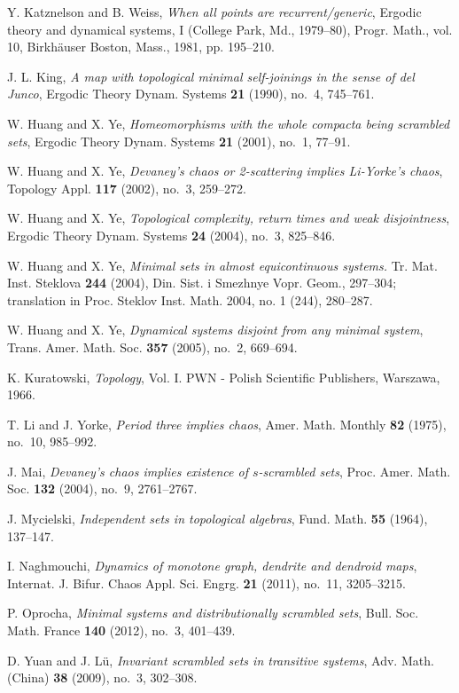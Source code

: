\documentclass[reqno,a4paper,12pt]{amsart}
\theoremstyle{definition}
\numberwithin{equation}{section}
\begin{document}
\begin{thebibliography}{99}
 Y. Katznelson and B. Weiss, \emph{When all points are recurrent/generic},
Ergodic theory and dynamical systems, I (College Park, Md., 1979--80), Progr. Math., vol. 10,
Birkh\"auser Boston, Mass., 1981, pp. 195--210.

 J. L. King, \emph{A map with topological minimal self-joinings in the sense of del Junco},
Ergodic Theory Dynam. Systems \textbf{21} (1990), no.~4, 745--761.

 W. Huang and X. Ye, \emph{Homeomorphisms with the whole compacta being scrambled sets},
Ergodic Theory Dynam. Systems \textbf{21} (2001), no.~1, 77--91.

 W. Huang and X. Ye, \emph{Devaney's chaos or 2-scattering implies {L}i-{Y}orke's chaos},
  Topology Appl. \textbf{117} (2002), no.~3, 259--272.

 W. Huang and X. Ye, \emph{Topological complexity, return times and weak disjointness},
Ergodic Theory Dynam. Systems \textbf{24} (2004), no.~3, 825--846.

 W. Huang and X. Ye,
\emph{Minimal sets in almost equicontinuous systems.} Tr. Mat. Inst. Steklova \textbf{244} (2004),
Din. Sist. i Smezhnye Vopr. Geom., 297--304;
translation in Proc. Steklov Inst. Math. 2004, no. 1 (244), 280--287.

 W. Huang and X. Ye, \emph{Dynamical systems disjoint from any minimal system},
 Trans. Amer. Math. Soc. \textbf{357} (2005), no.~2,  669--694.

 K. Kuratowski, \emph{Topology}, Vol. I. PWN - Polish Scientific Publishers, Warszawa, 1966.

 T. Li and J. Yorke, \emph{Period three implies chaos},
Amer. Math. Monthly \textbf{82} (1975), no.~10, 985--992.

 J. Mai, \emph{Devaney's chaos implies existence of $s$-scrambled sets},
Proc. Amer. Math. Soc. \textbf{132} (2004), no.~9, 2761--2767.

 J. Mycielski, \emph{Independent sets in topological algebras}, Fund. Math. \textbf{55} (1964), 137--147.

 I. Naghmouchi, \emph{Dynamics of monotone graph, dendrite and dendroid maps},
Internat. J. Bifur. Chaos Appl. Sci. Engrg. \textbf{21} (2011), no.~11, 3205--3215.

 P. Oprocha, \emph{Minimal systems and distributionally scrambled sets},
Bull. Soc. Math. France \textbf{140} (2012),  no.~3, 401--439.

 D. Yuan and J. L\"u, \emph{Invariant scrambled sets in transitive systems},
 Adv. Math. (China) \textbf{38} (2009), no.~3, 302--308.
\end{thebibliography}
\end{document}
